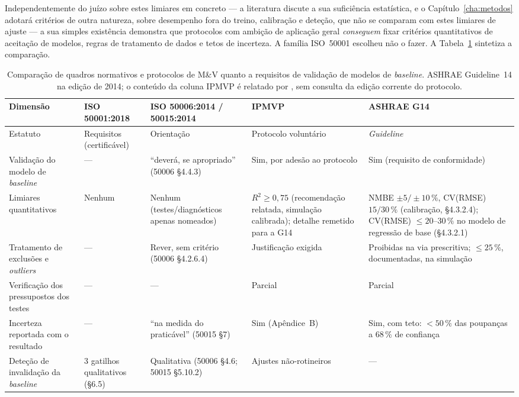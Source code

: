Independentemente do juízo sobre estes limiares em concreto --- a literatura discute a sua suficiência estatística, e o Capítulo~\ref{cha:metodos} adotará critérios de outra natureza, sobre desempenho fora do treino, calibração e deteção, que não se comparam com estes limiares de ajuste --- a sua simples existência demonstra que protocolos com ambição de aplicação geral \emph{conseguem} fixar critérios quantitativos de aceitação de modelos, regras de tratamento de dados e tetos de incerteza. A família ISO~50001 escolheu não o fazer. A Tabela~\ref{tab:comparacao-frameworks} sintetiza a comparação.

\begin{table}[htbp]
  \centering\footnotesize
  \caption[Comparação de quadros normativos quanto a requisitos de validação]{Comparação de quadros normativos e protocolos de M\&V quanto a requisitos de validação de modelos de \emph{baseline}. ASHRAE Guideline~14 na edição de 2014; o conteúdo da coluna IPMVP é relatado por \textcite{RuizBandera2017}, sem consulta da edição corrente do protocolo.}
  \label{tab:comparacao-frameworks}
  \begin{tabularx}{\textwidth}{@{}>{\raggedright\arraybackslash}p{3.2cm} X X X X@{}}
    \toprule
    \textbf{Dimensão} & \textbf{ISO 50001:2018} & \textbf{ISO 50006:2014 / 50015:2014} & \textbf{IPMVP} & \textbf{ASHRAE G14} \\
    \midrule
    Estatuto & Requisitos (certificável) & Orientação & Protocolo voluntário & \emph{Guideline} \\
    \addlinespace
    Validação do modelo de \emph{baseline} & --- & \enquote{deverá, se apropriado} (50006 \S4.4.3) & Sim, por adesão ao protocolo & Sim (requisito de conformidade) \\
    \addlinespace
    Limiares quantitativos & Nenhum & Nenhum (testes/diagnósticos apenas nomeados) & $R^2 \geq 0{,}75$ (recomendação relatada, simulação calibrada); detalhe remetido para a G14 & NMBE $\pm5/\pm10\,\%$, CV(RMSE) $15/30\,\%$ (calibração, \S4.3.2.4); CV(RMSE) $\leq 20$--$30\,\%$ no modelo de regressão de base (\S4.3.2.1) \\
    \addlinespace
    Tratamento de exclusões e \emph{outliers} & --- & Rever, sem critério (50006 \S4.2.6.4) & Justificação exigida & Proibidas na via prescritiva; $\leq 25\,\%$, documentadas, na simulação \\
    \addlinespace
    Verificação dos pressupostos dos testes & --- & --- & Parcial & Parcial \\
    \addlinespace
    Incerteza reportada com o resultado & --- & \enquote{na medida do praticável} (50015 \S7) & Sim (Apêndice~B) & Sim, com teto: $<50\,\%$ das poupanças a $68\,\%$ de confiança \\
    \addlinespace
    Deteção de invalidação da \emph{baseline} & 3 gatilhos qualitativos (\S6.5) & Qualitativa (50006 \S4.6; 50015 \S5.10.2) & Ajustes não-rotineiros & --- \\
    \bottomrule
  \end{tabularx}
\end{table}

